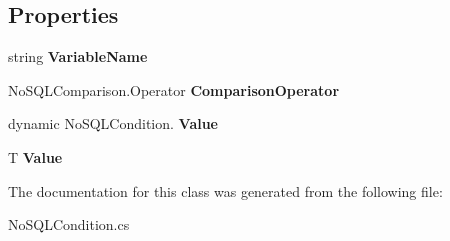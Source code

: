 \subsection*{Properties}
\begin{DoxyCompactItemize}
\item 
\hypertarget{class_swt_lib_1_1_no_s_q_l_condition_3_01_t_01_4_a2fb2ac05d4c8ebfe22e44779b720221c}{string {\bfseries Variable\-Name}}\label{class_swt_lib_1_1_no_s_q_l_condition_3_01_t_01_4_a2fb2ac05d4c8ebfe22e44779b720221c}

\item 
\hypertarget{class_swt_lib_1_1_no_s_q_l_condition_3_01_t_01_4_a7b42a24d3ded412e244efb784ad5f81e}{No\-S\-Q\-L\-Comparison.\-Operator {\bfseries Comparison\-Operator}}\label{class_swt_lib_1_1_no_s_q_l_condition_3_01_t_01_4_a7b42a24d3ded412e244efb784ad5f81e}

\item 
\hypertarget{class_swt_lib_1_1_no_s_q_l_condition_3_01_t_01_4_a1578276a14bc81aeacb973e6973b22f8}{dynamic No\-S\-Q\-L\-Condition. {\bfseries Value}}\label{class_swt_lib_1_1_no_s_q_l_condition_3_01_t_01_4_a1578276a14bc81aeacb973e6973b22f8}

\item 
\hypertarget{class_swt_lib_1_1_no_s_q_l_condition_3_01_t_01_4_ae54344945a9c5aeb1043fb6e4f623ece}{T {\bfseries Value}}\label{class_swt_lib_1_1_no_s_q_l_condition_3_01_t_01_4_ae54344945a9c5aeb1043fb6e4f623ece}

\end{DoxyCompactItemize}


The documentation for this class was generated from the following file\-:\begin{DoxyCompactItemize}
\item 
No\-S\-Q\-L\-Condition.\-cs\end{DoxyCompactItemize}
